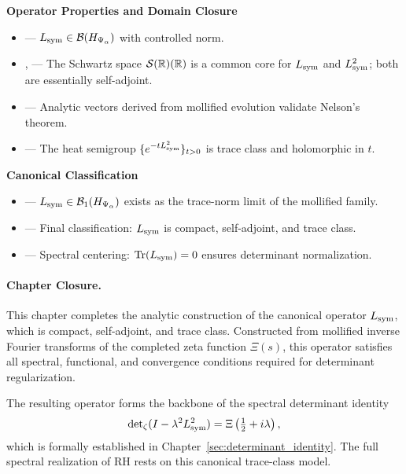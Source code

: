 \textbf{Operator Properties and Domain Closure}
\begin{itemize}
  \item {} — \( L_{\mathrm{sym}} \in \mathcal{B}(H_{\Psi_\alpha}) \) with controlled norm.
  \item {},  — The Schwartz space \( \mathcal{S}(\mathbb{R})(\mathbb{R}) \) is a common core for \( L_{\mathrm{sym}} \) and \( L_{\mathrm{sym}}^2 \); both are essentially self-adjoint.
  \item {} — Analytic vectors derived from mollified evolution validate Nelson’s theorem.
  \item {} — The heat semigroup \( \{ e^{-t L_{\mathrm{sym}}^2} \}_{t > 0} \) is trace class and holomorphic in \( t \).
\end{itemize}

\textbf{Canonical Classification}
\begin{itemize}
  \item {} — \( L_{\mathrm{sym}} \in \mathcal{B}_1(H_{\Psi_\alpha}) \) exists as the trace-norm limit of the mollified family.
  \item {} — Final classification: \( L_{\mathrm{sym}} \) is compact, self-adjoint, and trace class.
  \item {} — Spectral centering: \( \operatorname{Tr}(L_{\mathrm{sym}}) = 0 \) ensures determinant normalization.
\end{itemize}

\paragraph{Chapter Closure.}
This chapter completes the analytic construction of the canonical operator \( L_{\mathrm{sym}} \), which is compact, self-adjoint, and trace class. Constructed from mollified inverse Fourier transforms of the completed zeta function \( \Xi(s) \), this operator satisfies all spectral, functional, and convergence conditions required for determinant regularization.

The resulting operator forms the backbone of the spectral determinant identity
\[
\det\nolimits_{\zeta}(I - \lambda^2 L_{\mathrm{sym}}^2) = \Xi\left(\tfrac{1}{2} + i\lambda\right),
\]
which is formally established in Chapter~\ref{sec:determinant_identity}. The full spectral realization of RH rests on this canonical trace-class model.
